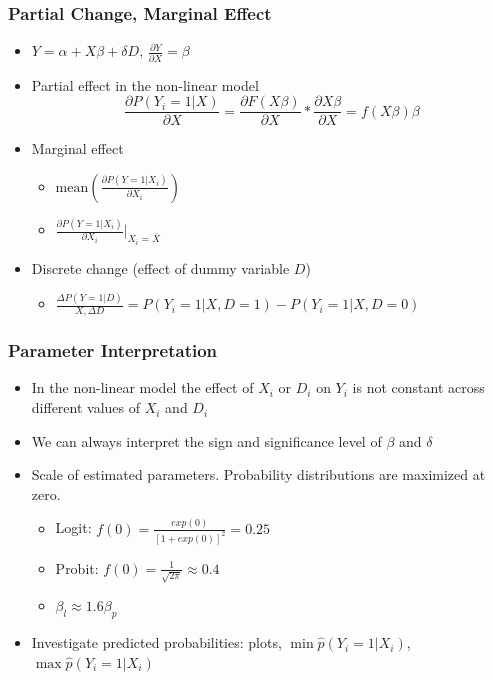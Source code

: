 \documentclass[pdftex]{beamer}
\begin{document}
\begin{frame}
\frametitle{Partial Change, Marginal Effect}

\begin{itemize}
  \item $Y = \alpha + X \beta + \delta D$, $\frac{\partial Y}{\partial X}=\beta$
  \item Partial effect in the non-linear model
  \begin{equation*}
    \frac{\partial P(Y_i=1|X )}{\partial X}= \frac{\partial F(X \beta)}{\partial X} \ast  \frac{\partial X \beta}{\partial X} = f(X \beta)\beta
  \end{equation*}
 \item  Marginal effect
 \begin{itemize}
   \item $\text{mean}\left(\frac{\partial P(Y=1|X_i)}{\partial X_i} \right)$
   \item $  \frac{\partial P(Y=1|X_i)}{\partial X_i}|_{X_i=\bar{X}}$
 \end{itemize}
\item  Discrete change (effect of dummy variable $D$)
\begin{itemize}
   \item $\frac{\Delta P(Y=1|D)}{X, \Delta D} = P(Y_i=1|X, D=1 ) - P(Y_i=1|X, D=0 )  $
 \end{itemize}
 
 \end{itemize}
\end{frame}


  \begin{frame}
\frametitle{Parameter Interpretation}

\begin{itemize}
  \item In the non-linear model the effect of $X_i$ or $D_i$ on $Y_i$ is not constant across different values of $X_i$ and $D_i$
  \item We can always interpret the sign and significance level of $\beta$ and $\delta$
  \item Scale of estimated parameters. Probability distributions are maximized at zero. 
  \begin{itemize}
    \item Logit: $f(0)=\frac{exp(0)}{[1+exp(0)]^2}=0.25$
    \item Probit: $f(0)=\frac{1}{\sqrt{2 \pi}} \approx 0.4$
    \item $\beta_l  \approx 1.6 \beta_p$
  \end{itemize}
  \item Investigate predicted probabilities: plots, $\min \hat{p}(Y_i=1|X_i)$,  $\max \hat{p}(Y_i=1|X_i)$
\end{itemize}
\end{frame}
\end{document}
